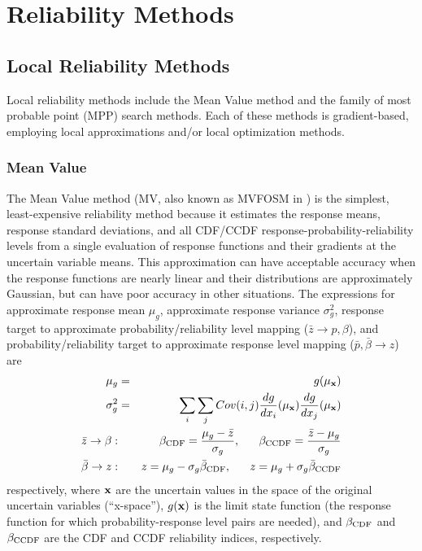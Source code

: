 \chapter{Reliability Methods}\label{uq:reliability}



\section{Local Reliability Methods}\label{uq:reliability:local}

Local reliability methods include the Mean Value method and the family
of most probable point (MPP) search methods.  Each of these methods is
gradient-based, employing local approximations and/or local
optimization methods.


\subsection{Mean Value}\label{uq:reliability:local:mv}

The Mean Value method (MV, also known as MVFOSM in \cite{Hal00}) is
the simplest, least-expensive reliability method because it estimates
the response means, response standard deviations, and all CDF/CCDF
response-probability-reliability levels from a single evaluation of
response functions and their gradients at the uncertain variable
means.  This approximation can have acceptable accuracy when the
response functions are nearly linear and their distributions are
approximately Gaussian, but can have poor accuracy in other
situations.  The expressions for approximate response mean $\mu_g$,
approximate response variance $\sigma^2_g$, response target to
approximate probability/reliability level mapping ($\bar{z} \to p,\beta$),
and probability/reliability target to approximate response level mapping
($\bar{p},\bar{\beta} \to z$) are
\begin{eqnarray}
\mu_g      & = & g(\mu_{\bf x})  \label{eq:mv_mean1} \\
\sigma^2_g & = & \sum_i \sum_j Cov(i,j) \frac{dg}{dx_i}(\mu_{\bf x})
                 \frac{dg}{dx_j}(\mu_{\bf x}) \label{eq:mv_std_dev} \\
\bar{z} \rightarrow \beta: & ~ & 
\beta_{\rm CDF} = \frac{\mu_g - \bar{z}}{\sigma_g}, ~~~~~
\beta_{\rm CCDF} = \frac{\bar{z} - \mu_g}{\sigma_g} \label{eq:mv_ria} \\
\bar{\beta} \rightarrow z: & ~ & 
z = \mu_g - \sigma_g \bar{\beta}_{\rm CDF}, ~~~~~
z = \mu_g + \sigma_g \bar{\beta}_{\rm CCDF} \label{eq:mv_pma}
\end{eqnarray}
respectively, where ${\bf x}$ are the uncertain values in the 
space of the original uncertain variables (``x-space''), $g({\bf x})$
is the limit state function (the response function for which
probability-response level pairs are needed), and $\beta_{\rm CDF}$ and
$\beta_{\rm CCDF}$ are the CDF and CCDF reliability indices, respectively.

